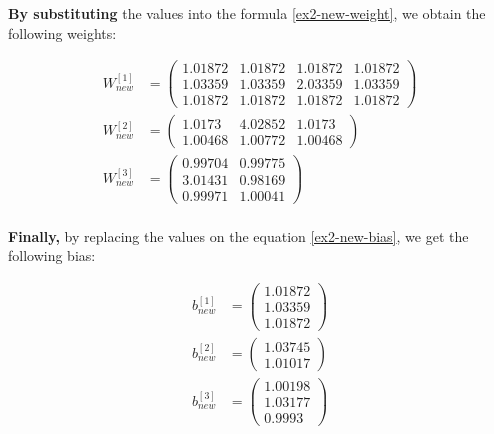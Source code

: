 \documentclass[12pt]{article}
\begin{document}
\begin{enumerate}[leftmargin=\labelsep]
          \textbf{By substituting} the values into the formula \ref{ex2-new-weight}, we obtain the following weights:

          \begin{align*}
            W^{[1]}_{new} &= \begin{pmatrix} 1.01872 & 1.01872 & 1.01872 & 1.01872 \\ 1.03359 & 1.03359 & 2.03359 & 1.03359 \\ 1.01872 & 1.01872 & 1.01872 & 1.01872 \end{pmatrix} \\
            W^{[2]}_{new} &= \begin{pmatrix} 1.0173 & 4.02852 & 1.0173 \\ 1.00468 & 1.00772 & 1.00468\end{pmatrix} \\
            W^{[3]}_{new} &= \begin{pmatrix} 0.99704 & 0.99775 \\ 3.01431 & 0.98169 \\ 0.99971 & 1.00041\end{pmatrix} \\
          \end{align*}

          \textbf{Finally,} by replacing the values on the equation \ref{ex2-new-bias}, we get the following bias:

          \begin{align*}
            b^{[1]}_{new} &= \begin{pmatrix} 1.01872 \\ 1.03359 \\ 1.01872\end{pmatrix} \\
            b^{[2]}_{new} &= \begin{pmatrix} 1.03745 \\ 1.01017\end{pmatrix} \\
            b^{[3]}_{new} &= \begin{pmatrix} 1.00198 \\ 1.03177 \\ 0.9993\end{pmatrix} \\
          \end{align*}

\end{enumerate}

\vskip 0.5cm
\end{document}
